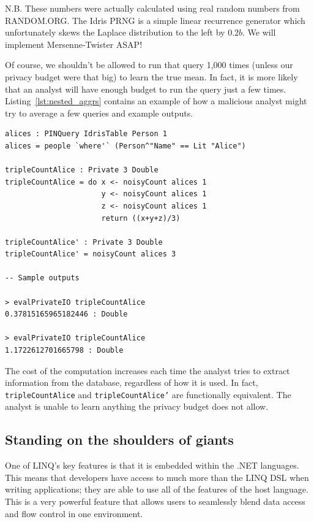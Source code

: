 \documentclass[12pt]{article}
\begin{document}
{\color{red}
  N.B. These numbers were actually calculated using real random numbers from RANDOM.ORG.
  The Idris PRNG is a simple linear recurrence generator which unfortunately skews the Laplace distribution to the left by $0.2b$.
  We will implement Mersenne-Twister ASAP!
}

Of course, we shouldn't be allowed to run that query 1,000 times (unless our privacy budget were that big) to learn the true mean.
In fact, it is more likely that an analyst will have enough budget to run the query just a few times.
Listing~\ref{lst:nested_aggrs} contains an example of how a malicious analyst might try to average a few queries and example outputs.

\begin{lstlisting}[caption={Example of nested aggregations},label={lst:nested_aggrs}]
alices : PINQuery IdrisTable Person 1
alices = people `where'` (Person^"Name" == Lit "Alice")

tripleCountAlice : Private 3 Double
tripleCountAlice = do x <- noisyCount alices 1
                      y <- noisyCount alices 1
                      z <- noisyCount alices 1
                      return ((x+y+z)/3)

tripleCountAlice' : Private 3 Double
tripleCountAlice' = noisyCount alices 3

-- Sample outputs

> evalPrivateIO tripleCountAlice
0.37815165965182446 : Double

> evalPrivateIO tripleCountAlice
1.1722612701665798 : Double
\end{lstlisting}

The cost of the computation increases each time the analyst tries to extract information from the database, regardless of how it is used.
In fact, \texttt{tripleCountAlice} and \texttt{tripleCountAlice'} are functionally equivalent.
The analyst is unable to learn anything the privacy budget does not allow.


\subsection{Standing on the shoulders of giants}


One of LINQ's key features is that it is embedded within the .NET languages.
This means that developers have access to much more than the LINQ DSL when writing applications; they are able to use all of the features of the host language.
This is a very powerful feature that allows users to seamlessly blend data access and flow control in one environment.
\end{document}

